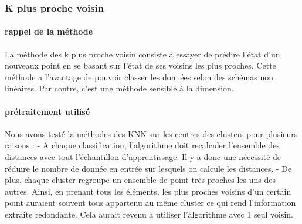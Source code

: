 \documentclass[a4paper,10pt]{report}
\begin{document}
\subsubsection{K plus proche voisin}
\paragraph{rappel de la méthode }
La méthode des k plus proche voisin consiste à essayer de prédire l’état d'un nouveaux point en se basant sur l'état de ses voisins les plus proches. Cette méthode a l'avantage de pouvoir classer les données selon des schémas non linéaires. Par contre, c'est une méthode sensible à la dimension. 
\paragraph{prétraitement utilisé}
Nous avons testé la méthodes des KNN sur les centres des clusters pour plusieurs raisons :
- A chaque classification, l'algorithme doit recalculer l'ensemble des distances avec tout l’échantillon d'apprentissage. Il y a donc une nécessité de réduire le nombre de donnée en entrée sur lesquels on calcule les distances.
- De plus, chaque cluster regroupe un ensemble de point très proches les uns des autres. Ainsi, en prenant tous les éléments, les plus proches voisins d'un certain point auraient souvent tous appartenu au même cluster ce qui rend l'information extraite redondante. Cela aurait revenu à utiliser l'algorithme avec 1 seul voisin. 
\end{document}

